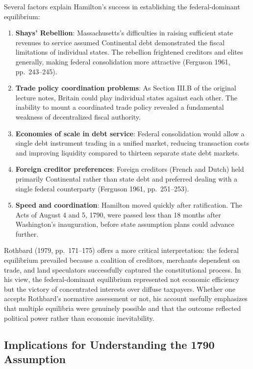 \documentclass[12pt]{article}
\begin{document}
Several factors explain Hamilton's success in establishing the federal-dominant equilibrium:

\begin{enumerate}
\item \textbf{Shays' Rebellion}: Massachusetts's difficulties in raising sufficient state revenues to service assumed Continental debt demonstrated the fiscal limitations of individual states. The rebellion frightened creditors and elites generally, making federal consolidation more attractive (Ferguson 1961, pp.~243--245).

\item \textbf{Trade policy coordination problems}: As Section III.B of the original lecture notes, Britain could play individual states against each other. The inability to mount a coordinated trade policy revealed a fundamental weakness of decentralized fiscal authority.

\item \textbf{Economies of scale in debt service}: Federal consolidation would allow a single debt instrument trading in a unified market, reducing transaction costs and improving liquidity compared to thirteen separate state debt markets.

\item \textbf{Foreign creditor preferences}: Foreign creditors (French and Dutch) held primarily Continental rather than state debt and preferred dealing with a single federal counterparty (Ferguson 1961, pp.~251--253).

\item \textbf{Speed and coordination}: Hamilton moved quickly after ratification. The Acts of August 4 and 5, 1790, were passed less than 18 months after Washington's inauguration, before state assumption plans could advance further.
\end{enumerate}

Rothbard (1979, pp.~171--175) offers a more critical interpretation: the federal equilibrium prevailed because a coalition of creditors, merchants dependent on trade, and land speculators successfully captured the constitutional process. In his view, the federal-dominant equilibrium represented not economic efficiency but the victory of concentrated interests over diffuse taxpayers. Whether one accepts Rothbard's normative assessment or not, his account usefully emphasizes that multiple equilibria were genuinely possible and that the outcome reflected political power rather than economic inevitability.

\subsection{Implications for Understanding the 1790 Assumption}
\end{document}
